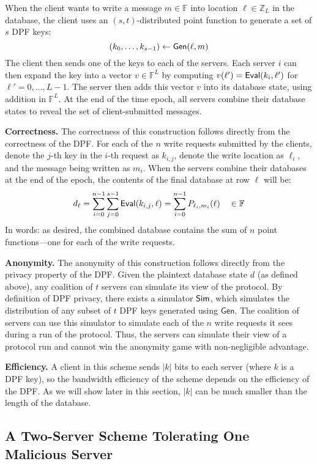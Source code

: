 \documentclass[10pt,twocolumn]{article}
\newcommand{\Z}{\mathbb{Z}}
\newcommand{\F}{\mathbb{F}}
\newcommand{\Gen}{\ensuremath{\mathsf{Gen}}\xspace}
\newcommand{\nicepara}[1]{\medskip\noindent\textbf{#1.}}
\begin{document}
When the client wants to write a message $m \in \F$ into location
$\ell \in \Z_L$ in the database, the client 
uses an $(s,t)$-distributed point function to generate a set of
$s$ DPF keys:
\[ (k_0, \dots, k_{s-1}) \gets {\sf Gen}(\ell, m) \]
The client then sends one of the keys to each of the servers.
Each server $i$ can then expand
the key into a vector $v \in \F^L$
by computing $v(\ell') = {\sf Eval}(k_i, \ell')$ for $\ell' = 0, \dots, L-1$.
The server then adds this vector $v$ into its database state,
using addition in $\F^L$.
At the end of the time epoch, all servers combine their database
states to reveal the set of client-submitted messages.


\nicepara{Correctness}
The correctness of this construction follows directly
from the correctness of the DPF.
For each of the $n$ write requests submitted by the clients, 
denote the $j$-th key in the $i$-th request as $k_{i,j}$,
denote the write location as $\ell_i$, and the message
being written as $m_i$.
When the servers combine their databases at the end of the
epoch, the contents of the final database at row $\ell$ will be:
\begin{align*}
d_\ell = \sum_{i=0}^{n-1} \sum_{j=0}^{s-1} {\sf Eval}(k_{i,j}, \ell) 
    = \sum_{i=0}^{n-1} P_{\ell_i, m_i}(\ell) \quad \in \F
\end{align*}
In words: as desired, 
the combined database contains the sum of $n$ point
functions---one for each of the write requests.

\nicepara{Anonymity}
The anonymity of this construction 
follows directly from the privacy property of the DPF.
Given the plaintext database state $d$ (as defined above),
any coalition of $t$ servers can simulate its view of the protocol.
By definition of DPF privacy, there exists
a simulator ${\sf Sim}$, which simulates the
distribution of any subset of $t$ DPF keys generated
using $\Gen$.
The coalition of servers can use this simulator to simulate each
of the $n$ write requests it sees during a run of the protocol.
Thus, the servers can simulate their view of a
protocol run and cannot win the anonymity game
with non-negligible advantage. 

\nicepara{Efficiency}
A client in this scheme sends $|k|$ bits to each
server (where $k$ is a DPF key), so the 
bandwidth efficiency of 
the scheme depends on the efficiency of the DPF.
As we will show later in this section, $|k|$ can be
much smaller than the length of the database.

\subsection{A Two-Server Scheme Tolerating One Malicious Server}
\label{sec:dpf:twoserver}
\end{document}
